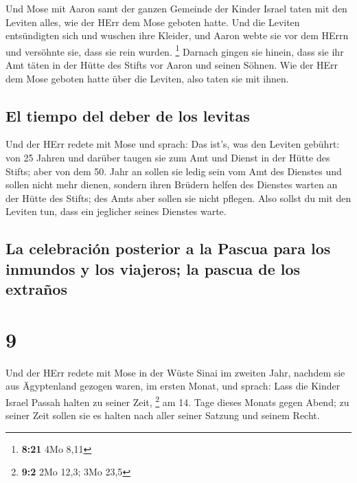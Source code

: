  Und Mose mit Aaron samt der ganzen Gemeinde der Kinder
Israel taten mit den Leviten alles, wie der HErr dem Mose geboten hatte.
 Und die Leviten entsündigten sich und wuschen ihre
Kleider, und Aaron webte sie vor dem HErrn und versöhnte sie, dass sie
rein wurden. \footnote{\textbf{8:21} 4Mo 8,11}  Darnach
gingen sie hinein, dass sie ihr Amt täten in der Hütte des Stifts vor
Aaron und seinen Söhnen. Wie der HErr dem Mose geboten hatte über die
Leviten, also taten sie mit ihnen.

\hypertarget{el-tiempo-del-deber-de-los-levitas}{%
\subsection{El tiempo del deber de los
levitas}\label{el-tiempo-del-deber-de-los-levitas}}

 Und der HErr redete mit Mose und sprach: 
Das ist's, was den Leviten gebührt: von 25 Jahren und darüber taugen sie
zum Amt und Dienst in der Hütte des Stifts;  aber von dem
50. Jahr an sollen sie ledig sein vom Amt des Dienstes und sollen nicht
mehr dienen,  sondern ihren Brüdern helfen des Dienstes
warten an der Hütte des Stifts; des Amts aber sollen sie nicht pflegen.
Also sollst du mit den Leviten tun, dass ein jeglicher seines Dienstes
warte.

\hypertarget{la-celebraciuxf3n-posterior-a-la-pascua-para-los-inmundos-y-los-viajeros-la-pascua-de-los-extrauxf1os}{%
\subsection{La celebración posterior a la Pascua para los inmundos y los
viajeros; la pascua de los
extraños}\label{la-celebraciuxf3n-posterior-a-la-pascua-para-los-inmundos-y-los-viajeros-la-pascua-de-los-extrauxf1os}}

\hypertarget{section-8}{%
\section{9}\label{section-8}}

 Und der HErr redete mit Mose in der Wüste Sinai im
zweiten Jahr, nachdem sie aus Ägyptenland gezogen waren, im ersten
Monat, und sprach:  Lass die Kinder Israel Passah halten
zu seiner Zeit, \footnote{\textbf{9:2} 2Mo 12,3; 3Mo 23,5}
 am 14. Tage dieses Monats gegen Abend; zu seiner Zeit
sollen sie es halten nach aller seiner Satzung und seinem Recht.

